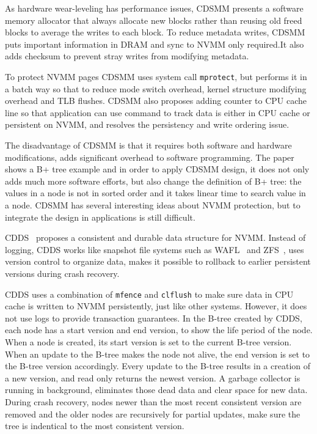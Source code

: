 As hardware wear-leveling has performance issues, CDSMM presents a
software memory allocator that always allocate new blocks rather than reusing
old freed blocks to average the writes to each block. To reduce metadata
writes, CDSMM puts important information in DRAM and sync to NVMM only required.It also adds checksum to prevent stray writes from modifying metadata.

To protect NVMM pages CDSMM uses system call \texttt{mprotect}, but performs
it in a batch way so that to reduce mode switch overhead, kernel structure
modifying overhead and TLB flushes. CDSMM also proposes adding counter to CPU
cache line so that application can use command to track data is either in 
CPU cache or persistent on NVMM, and resolves the persistency and write ordering
issue. 

The disadvantage of CDSMM is that it requires both software and hardware
modifications, adds significant overhead to software programming. The paper
shows a B+ tree example and in order to apply CDSMM design, it does not only 
adds much more software efforts, but also change the definition of B+ tree:
the values in a node is not in sorted order and it takes linear time to search
value in a node. CDSMM has several interesting ideas about NVMM protection, but
to integrate the design in applications is still difficult.

CDDS~\cite{cdds} proposes a consistent and durable data structure for NVMM.
Instead of logging, CDDS works like snapshot file systems such as
WAFL~\cite{wafl} and ZFS~\cite{zfs}, uses version control to organize data,
makes it possible to rollback to earlier persistent versions during crash
recovery.

CDDS uses a combination of \texttt{mfence} and \texttt{clflush} to make sure
data in CPU cache is written to NVMM persistently, just like other systems.
However, it does not use logs to provide transaction guarantees. In the B-tree
created by CDDS, each node has a start version and end version, to show the
life period of the node. When a node is created, its start version is set
to the current B-tree version. When an update to the B-tree makes the node
not alive, the end version is set to the B-tree version accordingly.
Every update to the B-tree results in a creation of
a new version, and read only returns the newest version. A garbage collector
is running in background, eliminates those dead data and clear space for
new data. During crash recovery, nodes newer than the most recent consistent
version are removed and the older nodes are recursively for partial updates,
make sure the tree is indentical to the most consistent version.

